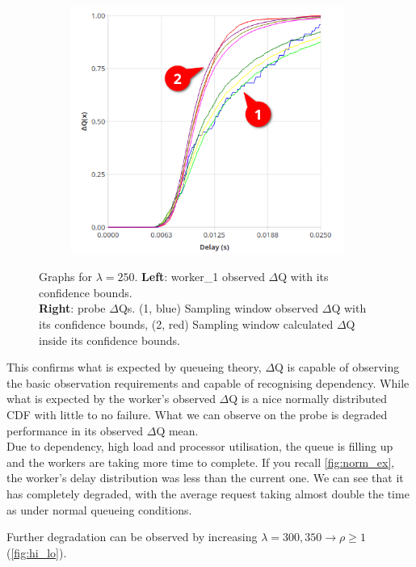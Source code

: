 \begin{figure}[H]
\begin{subfigure}{.5\textwidth}
                \includegraphics[width =0.98\textwidth]{img/overload_2/250_probe2.png}
                \label{fig:high_load_2}
            \end{subfigure}
            \caption{Graphs for $\lambda = 250$. \textbf{Left}: worker\_1 observed $\Delta$Q with its confidence bounds. \\
            \textbf{Right}: probe $\Delta$Qs. (1, blue) Sampling window observed $\Delta$Q with its confidence bounds, (2, red) Sampling window calculated $\Delta$Q inside its confidence bounds.}%
            \label{fig:early_ov}
        \end{figure} 
    This confirms what is expected by queueing theory, $\Delta$Q is capable of observing the basic observation requirements and capable of recognising dependency. While what is expected by the worker's observed $\Delta$Q is a nice normally distributed CDF with little to no failure. What we can observe on the probe is degraded performance in its observed $\Delta$Q mean. \\
    Due to dependency, high load and processor utilisation, the queue is filling up and the workers are taking more time to complete. If you recall \cref{fig:norm_ex}, the worker's delay distribution was less than the current one. We can see that it has completely degraded, with the average request taking almost double the time as under normal queueing conditions. 

    Further degradation can be observed by increasing $\lambda = {300, 350} \rightarrow \rho \ge 1$ (\cref{fig:hi_lo}).


